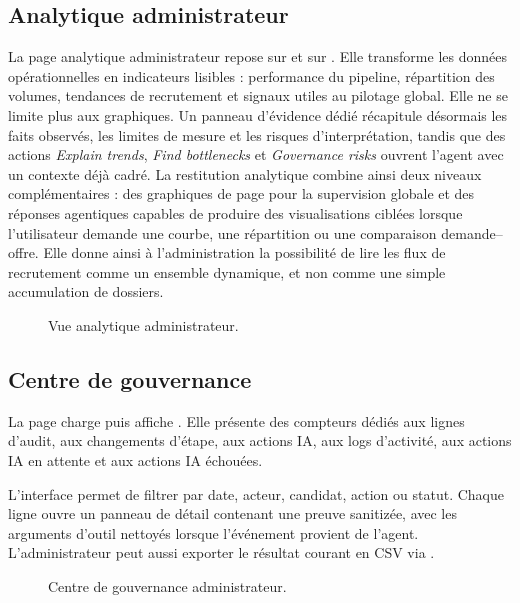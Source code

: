 \subsection{Analytique administrateur}
La page analytique administrateur repose sur  et sur . Elle transforme les données opérationnelles en indicateurs lisibles : performance du pipeline, répartition des volumes, tendances de recrutement et signaux utiles au pilotage global.
Elle ne se limite plus aux graphiques. Un panneau d'évidence dédié récapitule désormais les faits observés, les limites de mesure et les risques d'interprétation, tandis que des actions \textit{Explain trends}, \textit{Find bottlenecks} et \textit{Governance risks} ouvrent l'agent avec un contexte déjà cadré.
La restitution analytique combine ainsi deux niveaux complémentaires : des graphiques de page pour la supervision globale et des réponses agentiques capables de produire des visualisations ciblées lorsque l'utilisateur demande une courbe, une répartition ou une comparaison demande--offre.
Elle donne ainsi à l'administration la possibilité de lire les flux de recrutement comme un ensemble dynamique, et non comme une simple accumulation de dossiers.

\begin{figure}[H]
  \centering
  \caption{Vue analytique administrateur.}
\end{figure}

\subsection{Centre de gouvernance}
La page  charge  puis affiche . Elle présente des compteurs dédiés aux lignes d'audit, aux changements d'étape, aux actions IA, aux logs d'activité, aux actions IA en attente et aux actions IA échouées.

L'interface permet de filtrer par date, acteur, candidat, action ou statut. Chaque ligne ouvre un panneau de détail contenant une preuve sanitizée, avec les arguments d'outil nettoyés lorsque l'événement provient de l'agent. L'administrateur peut aussi exporter le résultat courant en CSV via .

\begin{figure}[H]
  \centering
  \caption{Centre de gouvernance administrateur.}
\end{figure}

